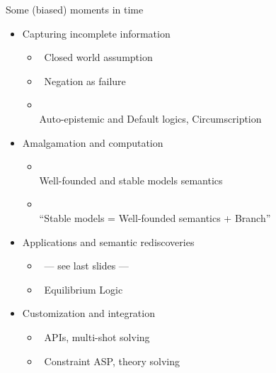 \begin{frame}{Some (biased) moments in time}
  \bigskip
  \begin{itemize}
  \item<1-6> Capturing incomplete information
    \begin{itemize}
    \item<only@2>  \ Closed world assumption
    \item<only@2>  \ Negation as failure
    \item<only@2> \\ Auto-epistemic and Default logics, Circumscription
    \end{itemize}
    \smallskip
  \item<1-6> Amalgamation and computation
    \begin{itemize}
    \item<only@3> \\ Well-founded and stable models semantics
    \item<only@3> \\ ``Stable models = Well-founded semantics + Branch''
    \end{itemize}
    \smallskip
  \item<1-6> Applications and semantic rediscoveries
    \begin{itemize}
    \item<only@4>  \ --- see last slides ---
    \item<only@4>    \ Equilibrium Logic
    \end{itemize}
    \smallskip
  \item<1-6> Customization and integration
    \begin{itemize}
    \item <only@5>  \ APIs, multi-shot solving
    \item <only@5>  \ Constraint ASP, theory solving
    \end{itemize}
  \end{itemize}
\end{frame}
%

